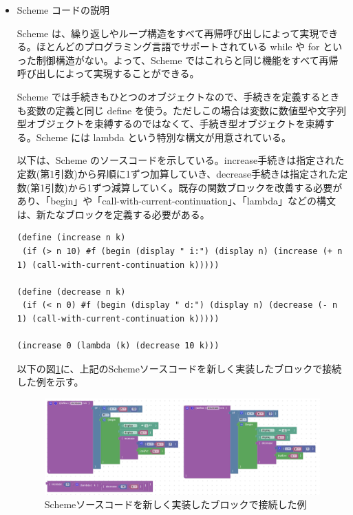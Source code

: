 \documentclass{risepaper}
\begin{document}
\begin{itemize}   

\item Scheme コードの説明

Scheme は、繰り返しやループ構造をすべて再帰呼び出しによって実現できる。ほとんどのプログラミング言語でサポートされている while や for といった制御構造がない。よって、Scheme ではこれらと同じ機能をすべて再帰呼び出しによって実現することができる。

Scheme では手続きもひとつのオブジェクトなので、手続きを定義するときも変数の定義と同じ define を使う。ただしこの場合は変数に数値型や文字列型オブジェクトを束縛するのではなくて、手続き型オブジェクトを束縛する。Scheme には lambda という特別な構文が用意されている。

以下は、Scheme のソースコードを示している。increase手続きは指定された定数(第1引数)から昇順に1ずつ加算していき、decrease手続きは指定された定数(第1引数)から1ずつ減算していく。既存の関数ブロックを改善する必要があり、「begin」や「call-with-current-continuation」、「lambda」などの構文は、新たなブロックを定義する必要がある。

\begin{lstlisting}[basicstyle=\ttfamily\footnotesize]
(define (increase n k)
 (if (> n 10) #f (begin (display " i:") (display n) (increase (+ n 1) (call-with-current-continuation k)))))

(define (decrease n k)
 (if (< n 0) #f (begin (display " d:") (display n) (decrease (- n 1) (call-with-current-continuation k)))))

(increase 0 (lambda (k) (decrease 10 k)))
\end{lstlisting}

以下の図\ref{fig:scheme_blocks_example}に、上記のSchemeソースコードを新しく実装したブロックで接続した例を示す。

\begin{figure}[h]
\begin{center}
\includegraphics[scale=0.5]{img/scheme_blocks_example.PNG}
\caption{Schemeソースコードを新しく実装したブロックで接続した例}%
\label{fig:scheme_blocks_example}
\end{center}%
\end{figure}%



\end{itemize}
\end{document}
